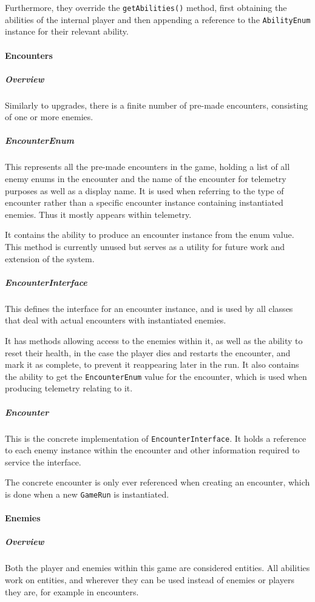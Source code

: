 Furthermore, they override the \texttt{getAbilities()} method, first obtaining the abilities of the internal player and then appending a reference to the \texttt{AbilityEnum} instance for their relevant ability.

\paragraph{Encounters}

\subparagraph{Overview}
Similarly to upgrades, there is a finite number of pre-made encounters, consisting of one or more enemies.

\subparagraph{EncounterEnum}
This represents all the pre-made encounters in the game, holding a list of all enemy enums in the encounter and the name of the encounter for telemetry purposes as well as a display name. It is used when referring to the type of encounter rather than a specific encounter instance containing instantiated enemies. Thus it mostly appears within telemetry.

It contains the ability to produce an encounter instance from the enum value. This method is currently unused but serves as a utility for future work and extension of the system.

\subparagraph{EncounterInterface}
This defines the interface for an encounter instance, and is used by all classes that deal with actual encounters with instantiated enemies.

It has methods allowing access to the enemies within it, as well as the ability to reset their health, in the case the player dies and restarts the encounter, and mark it as complete, to prevent it reappearing later in the run. It also contains the ability to get the \texttt{EncounterEnum} value for the encounter, which is used when producing telemetry relating to it.

\subparagraph{Encounter}
This is the concrete implementation of \texttt{EncounterInterface}. It holds a reference to each enemy instance within the encounter and other information required to service the interface.

The concrete encounter is only ever referenced when creating an encounter, which is done when a new \texttt{GameRun} is instantiated.

\paragraph{Enemies}

\subparagraph{Overview}
Both the player and enemies within this game are considered entities. All abilities work on entities, and wherever they can be used instead of enemies or players they are, for example in encounters.

